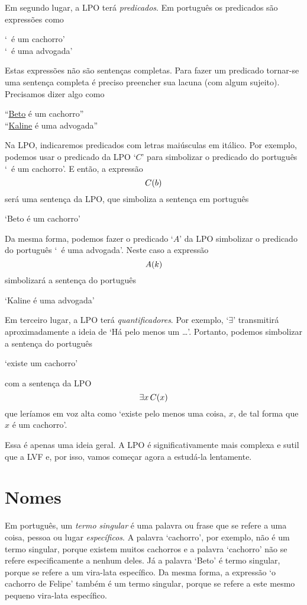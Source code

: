 Em segundo lugar, a LPO terá \emph{predicados}.
Em português os predicados são expressões como
\begin{center}
`\blank\ é um cachorro'\\ `\blank\ é uma advogada'
\end{center}
Estas expressões não são sentenças completas.
Para fazer um predicado tornar-se uma sentença completa é preciso preencher sua lacuna (com algum sujeito).
Precisamos dizer algo como
\begin{center}
``\underline{Beto} é um cachorro''\\
``\underline{Kaline} é uma advogada''
\end{center}
Na LPO, indicaremos predicados com letras maiúsculas em itálico.
Por exemplo, podemos usar o predicado da LPO `$C$' para simbolizar o predicado do português `\blank\ é um cachorro'.
E então, a expressão
$$\mathord{C}(b)$$
será uma sentença da LPO, que simboliza a sentença em português
\begin{center}
`Beto é um cachorro'
\end{center}
Da mesma forma, podemos fazer o predicado `$A$' da LPO simbolizar o predicado do português `\blank\ é uma advogada'.
Neste caso a expressão
$$\mathord{A}(k)$$
simbolizará a sentença do português
\begin{center}
`Kaline é uma advogada'
\end{center}
Em terceiro lugar, a LPO terá \emph{quantificadores}.
Por exemplo, `$\exists$' transmitirá aproximadamente a ideia de `Há pelo menos um \ldots'.
Portanto, podemos simbolizar a sentença do português
\begin{center}
`existe um cachorro'
\end{center}
com a sentença da LPO
$$\exists x\, \mathord{C}(x)$$
que leríamos em voz alta como `existe pelo menos uma coisa, $x$, de tal forma que $x$ é um cachorro'.

Essa é apenas uma ideia geral.
A LPO é significativamente mais complexa e sutil que a LVF e, por isso, vamos começar agora a estudá-la lentamente.


\section{Nomes}
Em português, um \emph{termo singular} é uma palavra ou frase que se refere a uma coisa, pessoa ou lugar \emph{específicos}.
A palavra `cachorro', por exemplo, não é um termo singular, porque existem muitos cachorros e a palavra `cachorro' não se refere especificamente a nenhum deles.
Já a palavra `Beto' é termo singular, porque se refere a um vira-lata específico.
Da mesma forma, a expressão `o cachorro de Felipe' também é um termo singular, porque se refere a este mesmo  pequeno vira-lata específico.

